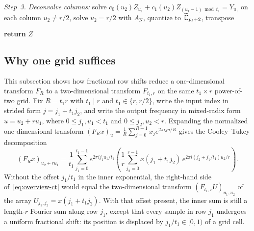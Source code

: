 \begin{algorithm}[!ht]
\begin{algorithmic}[1]
\State \emph{Step~3. Deconvolve columns:} solve $c_0(u_2) Z_{u_1} + c_1(u_2) Z_{(u_1-1)\bmod t_1} = Y_{u_1}$ on each column $u_2 \ne r/2$, solve $u_2 = r/2$ with $A_{\mathrm{N}}$, quantize to $\widetilde{\mathbb{C}}_{p_\ell+2}$, transpose 

\State \textbf{return} $Z$
\EndProcedure
\end{algorithmic}
\smallskip
{}
\end{algorithm}

\subsection{Why one grid suffices}\label{sec:overview-grid}

This subsection shows how fractional row shifts reduce a one-dimensional transform $F_R$ to a two-dimensional transform $F_{t_1, r}$ on the same $t_1 \times r$ power-of-two grid. Fix $R = t_1 r$ with $t_1 \mid r$ and $t_1 \in \{r, r/2\}$, write the input index in strided form $j = j_1 + t_1 j_2$, and write the output frequency in mixed-radix form $u = u_2 + r u_1$, where $0 \le j_1, u_1 < t_1$ and $0 \le j_2, u_2 < r$. Expanding the normalized one-dimensional transform $(F_R x)_u = \frac{1}{R}\sum_{j=0}^{R-1} x_j e^{2\pi i j u / R}$ gives the Cooley--Tukey decomposition
\begin{equation}\label{eq:overview-ct}
  (F_R x)_{u_2 + r u_1}
  = \frac{1}{t_1}\sum_{j_1=0}^{t_1-1} e^{2\pi i j_1 u_1 / t_1}
    \left(\frac{1}{r}\sum_{j_2=0}^{r-1} x(j_1 + t_1 j_2)\, e^{2\pi i (j_2 + j_1 / t_1) u_2 / r}\right).
\end{equation}
Without the offset $j_1 / t_1$ in the inner exponential, the right-hand side of~\eqref{eq:overview-ct} would equal the two-dimensional transform $(F_{t_1, r} U)_{u_1, u_2}$ of the array $U_{j_1, j_2} = x(j_1 + t_1 j_2)$. With that offset present, the inner sum is still a length-$r$ Fourier sum along row $j_1$, except that every sample in row $j_1$ undergoes a uniform fractional shift: its position is displaced by $j_1 / t_1 \in [0, 1)$ of a grid cell.

